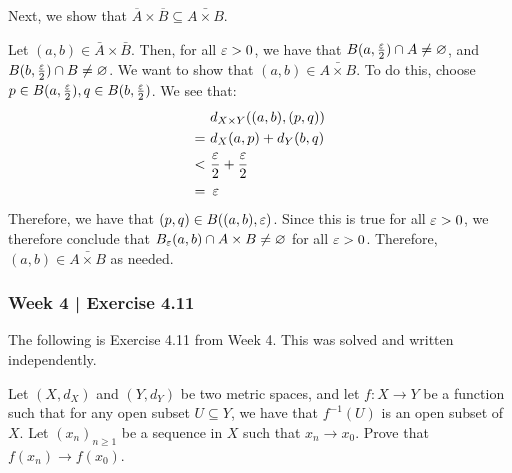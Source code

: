 \begin{pf}[source=Me]
    Next, we show that $ \overline{A} \times \overline{B} \subseteq
    \bar{A \times B} $. \npgh
    
    Let $ (a, b) \in \bar{A} \times \bar{B} $.
    Then, for all $ \operatorname{\varepsilon} > 0 $, we have that $ B(a, \frac{\operatorname{\varepsilon}}{2}) \cap A \neq
    \varnothing $, and $ B(b, \frac{\operatorname{\varepsilon}}{2}) \cap B \neq \varnothing $.
    We want to show that $ (a, b) \in \bar{A \times B} $. \vsp
    To do this, choose $ p \in B(a, \frac{\operatorname{\varepsilon}}{2}), q \in B(b, \frac{\operatorname{\varepsilon}}{2}) $.
    We see that:
    \begin{align*}
        & d_{X \times Y}((a, b), (p, q)) \\
        = \ & d_{X}(a, p) + d_{Y}(b, q) \\
        < \ & \frac{\operatorname{\varepsilon}}{2} + \frac{\operatorname{\varepsilon}}{2} \\
        = \ & \operatorname{\varepsilon}
    \end{align*}
    Therefore, we have that $ (p, q) \in B((a, b), \operatorname{\varepsilon}) $.
    Since this is true for all $ \operatorname{\varepsilon} > 0 $, we therefore conclude that
    $ B_{\operatorname{\varepsilon}}(a, b) \cap A \times B \neq \varnothing $ for all $ \operatorname{\varepsilon} > 0 $.
    Therefore, $ (a, b) \in \bar{A \times B} $ as needed.
\end{pf}

\newpage
\subsubsection{Week 4 | Exercise 4.11}
The following is Exercise 4.11 from Week 4.
This was solved and written independently.

\begin{exr}[num=4.11]
    Let $ (X, d_{X}) $ and $ (Y, d_{Y}) $ be two metric spaces, and let
    $ f: X \rightarrow Y $ be a function such that for any open subset $ U
    \subseteq Y $, we have that $ f^{-1}(U) $ is an open subset of $ X $. \vsp
    Let $ (x_{n})_{n \geq 1} $ be a sequence in $ X $ such that $ x_{n}
    \rightarrow x_{0} $. Prove that $ f(x_{n}) \rightarrow f(x_{0}) $.
\end{exr}

